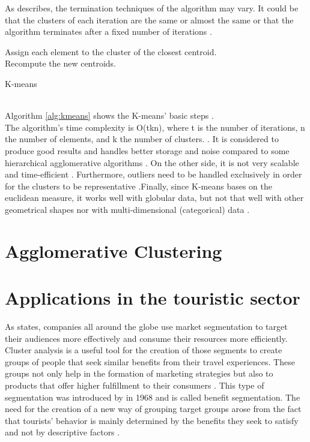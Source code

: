 As \textcite{dunham} describes, the termination techniques of the algorithm may vary. It could be that the clusters of each iteration are the same or almost the same or that the algorithm terminates after a fixed number of iterations \autocite[140]{dunham}.
\begin{algorithm}
\SetAlgoLined
{}
{
Assign each element to the cluster of the closest centroid.\\
Recompute the new centroids.
}
\caption{K-means}\label{alg:kmeans}
\end{algorithm} \\
Algorithm \ref{alg:kmeans} shows the K-means' basic steps \autocite{dunham, tanSteinKum}. \\
The algorithm's time complexity is O(tkn), where t is the number of iterations, n the number of elements, and k the number of clusters. \autocite[141]{dunham}. It is considered to produce good results and handles better storage and noise compared to some hierarchical agglomerative algorithms \autocite[526]{tanSteinKum}. On the other side, it is not very scalable and time-efficient \autocite[141]{dunham}. Furthermore, outliers need to be handled exclusively in order for the clusters to be representative \autocite[506]{tanSteinKum}.Finally, since K-means bases on the euclidean measure, it works well with globular data, but not that well with other geometrical shapes nor with multi-dimensional (categorical) data \autocite[647, 649]{survey}.

\section{Agglomerative Clustering}

\section{Applications in the touristic sector}
\label{applications}
As \textcite{data-drivenSegmentation} states, companies all around the globe use market segmentation to target their audiences more effectively and consume their resources more efficiently. Cluster analysis is a useful tool for the creation of those segments to create groups of people that seek similar benefits from their travel experiences. These groups not only help in the formation of marketing strategies but also to products that offer higher fulfillment to their consumers \autocite[17]{data-drivenSegmentation}. This type of segmentation was introduced by \textcite{Haley} in 1968 and is called benefit segmentation. The need for the creation of a new way of grouping target groups arose from the fact that tourists' behavior is mainly determined by the benefits they seek to satisfy and not by descriptive factors \autocite[31]{Haley}. \\

